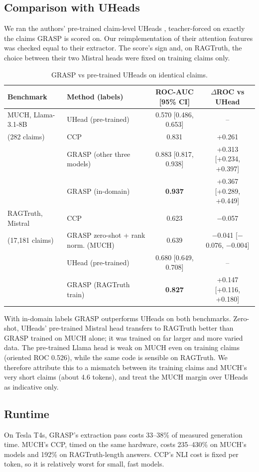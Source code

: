 \documentclass[11pt]{article}
\begin{document}
\subsection{Comparison with UHeads}
\label{sec:uheads}
We ran the authors' pre-trained claim-level UHeads \citep{shelmanov-etal-2025-head}, teacher-forced
on exactly the claims GRASP is scored on. Our reimplementation of their attention features was
checked equal to their extractor. The score's sign and, on RAGTruth, the choice between their two
Mistral heads were fixed on training claims only.
\begin{table}[h]
\centering\small
\begin{tabular}{llcc}
\toprule
Benchmark & Method (labels) & ROC-AUC [95\% CI] & $\Delta$ROC vs UHead \\
\midrule
MUCH, Llama-3.1-8B & UHead (pre-trained) & 0.570 [0.486, 0.653] & -- \\
(282 claims) & CCP & 0.831 & +0.261 \\
 & GRASP (other three models) & 0.883 [0.817, 0.938] & +0.313 [+0.234, +0.397] \\
 & GRASP (in-domain) & \textbf{0.937} & +0.367 [+0.289, +0.449] \\
\midrule
RAGTruth, Mistral & CCP & 0.623 & $-$0.057 \\
(17,181 claims) & GRASP zero-shot + rank norm. (MUCH) & 0.639 & $-$0.041 [$-$0.076, $-$0.004] \\
 & UHead (pre-trained) & 0.680 [0.649, 0.708] & -- \\
 & GRASP (RAGTruth train) & \textbf{0.827} & +0.147 [+0.116, +0.180] \\
\bottomrule
\end{tabular}
\caption{GRASP vs pre-trained UHeads on identical claims.}
\label{tab:uheads}
\end{table}
With in-domain labels GRASP outperforms UHeads on both benchmarks. Zero-shot, UHeads' pre-trained
Mistral head transfers to RAGTruth better than GRASP trained on MUCH alone; it was trained on far
larger and more varied data. The pre-trained Llama head is weak on MUCH even on training claims
(oriented ROC 0.526), while the same code is sensible on RAGTruth. We therefore attribute this to a
mismatch between its training claims and MUCH's very short claims (about 4.6 tokens), and treat the
MUCH margin over UHeads as indicative only.

\subsection{Runtime}
On Tesla T4s, GRASP's extraction pass costs 33--38\% of measured generation time. MUCH's CCP,
timed on the same hardware, costs 235--430\% on MUCH's models and 192\% on RAGTruth-length
answers. CCP's NLI cost is fixed per token, so it is relatively worst for small, fast models.
\end{document}
